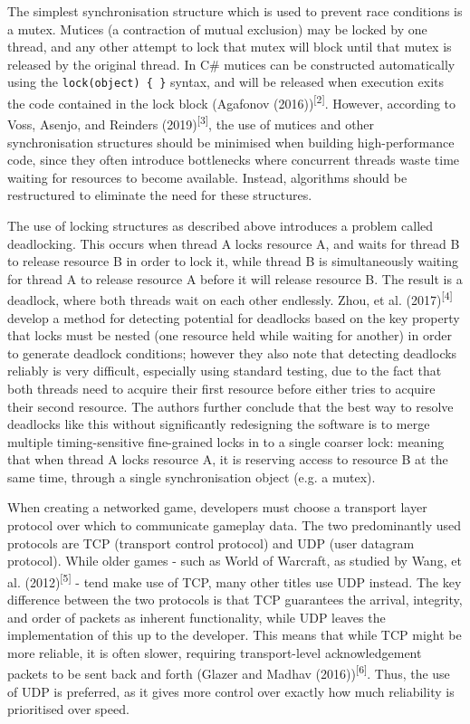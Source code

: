 \documentclass[
]{article}
\begin{document}
The simplest synchronisation structure which is used to prevent race
conditions is a mutex. Mutices (a contraction of \textquotesingle mutual
exclusion\textquotesingle) may be
\textquotesingle locked\textquotesingle{} by one thread, and any other
attempt to lock that mutex will block until that mutex is released by
the original thread. In C\# mutices can be constructed automatically
using the \texttt{lock(object)\ \{\ \}} syntax, and will be released
when execution exits the code contained in the lock block (Agafonov
(2016))\textsuperscript{{[}2{]}}. However, according to Voss, Asenjo,
and Reinders (2019)\textsuperscript{{[}3{]}}, the use of mutices and
other synchronisation structures should be minimised when building
high-performance code, since they often introduce bottlenecks where
concurrent threads waste time waiting for resources to become available.
Instead, algorithms should be restructured to eliminate the need for
these structures.

The use of locking structures as described above introduces a problem called deadlocking. This occurs when thread A locks resource A, and waits for thread B to release resource B in order to lock it, while thread B is simultaneously waiting for thread A to release resource A before it will release resource B. The result is a deadlock, where both threads wait on each other endlessly. Zhou, et al. (2017)\textsuperscript{{[}4{]}} develop a method for detecting potential for deadlocks based on the key property that locks must be nested (one resource held while waiting for another) in order to generate deadlock conditions; however they also note that detecting deadlocks reliably is very difficult, especially using standard testing, due to the fact that both threads need to acquire their first resource before either tries to acquire their second resource. The authors further conclude that the best way to resolve deadlocks like this without significantly redesigning the software is to merge multiple timing-sensitive fine-grained locks in to a single coarser lock: meaning that when thread A locks resource A, it is reserving access to resource B at the same time, through a single synchronisation object (e.g. a mutex).

When creating a networked game, developers must choose a transport layer
protocol over which to communicate gameplay data. The two predominantly
used protocols are TCP (transport control protocol) and UDP (user
datagram protocol). While older games - such as World of Warcraft, as
studied by Wang, et al. (2012)\textsuperscript{{[}5{]}} - tend make use
of TCP, many other titles use UDP instead. The key difference between
the two protocols is that TCP guarantees the arrival, integrity, and
order of packets as inherent functionality, while UDP leaves the
implementation of this up to the developer. This means that while TCP
might be more reliable, it is often slower, requiring transport-level
acknowledgement packets to be sent back and forth (Glazer and Madhav
(2016))\textsuperscript{{[}6{]}}. Thus, the use of UDP is preferred, as
it gives more control over exactly how much reliability is prioritised
over speed.
\end{document}
